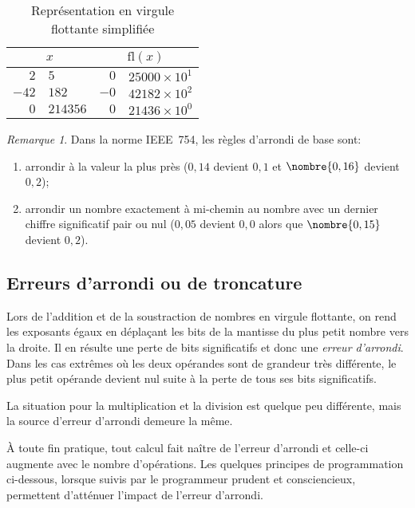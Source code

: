 \documentclass[letterpaper,11pt,english,french]{memoir}
\theoremstyle{plain}
\theoremstyle{definition}
\theoremstyle{remark}
\newtheorem*{remarque}{Remarque}
\newenvironment{rem}{\begin{remarque} \mbox{}}{\end{remarque}}
\newcommand{\fl}{\mathrm{fl}}
\begin{document}
\begin{table}
  \caption{Représentation en virgule flottante simplifiée}
  \label{tab:arithmetic:simplified}
  \centering
  \begin{tabular}{r@{,}lr@{,}l}
    \toprule
    \multicolumn{2}{c}{$x$} &
    \multicolumn{2}{c}{$\fl(x)$} \\
    \midrule
    $2$&$5$       & $0$&$25000 \times 10^1$ \\
    $-42$&$182$  & $-0$&$42182 \times 10^2$ \\
    $0$&$214356$ & $0$&$21436 \times 10^0$ \\
    \bottomrule
  \end{tabular}
\end{table}

\begin{rem}
  Dans la norme IEEE~754, les règles d'arrondi de base sont:
  \begin{enumerate}
  \item arrondir à la valeur la plus près ($0,14$ devient $0,1$ et
    $\nombre{0,16}$ devient $0,2$);
  \item arrondir un nombre exactement à mi-chemin au nombre avec un
    dernier chiffre significatif pair ou nul ($0,05$ devient $0,0$
    alors que $\nombre{0,15}$ devient $0,2$).
  \end{enumerate}
\end{rem}


\subsection{Erreurs d'arrondi ou de troncature}
\label{sec:ordinateurs:arithmetique:erreurs}

Lors de l'addition et de la soustraction de nombres en virgule
flottante, on rend les exposants égaux en déplaçant les bits de la
mantisse du plus petit nombre vers la droite. Il en résulte une perte
de bits significatifs et donc une \emph{erreur d'arrondi}. Dans les
cas extrêmes où les deux opérandes sont de grandeur très différente,
le plus petit opérande devient nul suite à la perte de tous ses bits
significatifs.

La situation pour la multiplication et la division est quelque peu
différente, mais la source d'erreur d'arrondi demeure la même.

À toute fin pratique, tout calcul fait naître de l'erreur d'arrondi et
celle-ci augmente avec le nombre d'opérations. Les quelques principes
de programmation ci-dessous, lorsque suivis par le programmeur prudent
et consciencieux, permettent d'atténuer l'impact de l'erreur
d'arrondi.
\end{document}
